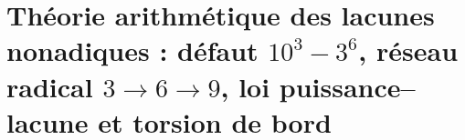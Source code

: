 \chapter{Théorie arithmétique des lacunes nonadiques : défaut \(10^3-3^6\), réseau radical \(3\to6\to9\), loi puissance--lacune et torsion de bord}
\label{chap:p3-final:47:vacancias_nonadicas}



